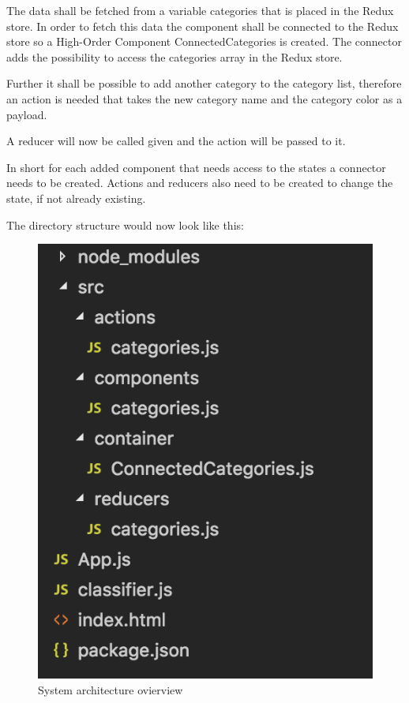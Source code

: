 

The data shall be fetched from a variable categories that is
placed in the Redux store.
In order to fetch this data the component shall be connected to the Redux store so a High-Order Component ConnectedCategories is created.
The connector adds the possibility to access the categories array in the Redux store.



Further it shall be possible to add another category to the category list, therefore an action is needed that takes the new category name and the category color as a payload.



A reducer will now be called given and the action will be passed to it.




In short for each added component that needs access to the states a connector needs to be created. Actions and reducers also need to be created to change the state, if not already existing.

The directory structure would now look like this:


\begin{figure}[H]
	\centering
	\includegraphics[width=\linewidth]{bilder/cyto/SystemArchitecture.png}
	\caption{System architecture ovierview}
	\label{fig:SystemOverview}
\end{figure}


